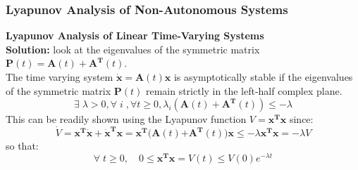 \documentclass[11pt,handout]{beamer}   %
\begin{document}
\begin{frame}
\frametitle{Lyapunov Analysis of Non-Autonomous Systems}
\small
\textbf{Lyapunov Analysis of Linear Time-Varying Systems}\\
\vspace{6pt}
\textbf{Solution:} look at the eigenvalues of the symmetric matrix $\mathbf{P}(t) = \mathbf{A}(t) + \mathbf{A^T}(t)$.\\
\vspace{6pt}
The time varying system $\mathbf{\dot{x}} = \mathbf{A}(t) \mathbf{x}$ is asymptotically stable if the eigenvalues of the symmetric matrix $\mathbf{P}(t)$ remain strictly in the left-half complex plane.\\
\begin{equation*}
\exists \; \lambda > 0 , \forall \; i \; , \forall t \geq 0 , \lambda_i (\mathbf{A}(t) + \mathbf{A^T}(t)) \leq - \lambda
\end{equation*}
This can be readily shown using the Lyapunov function $V = \mathbf{x^T x}$ since:
\begin{equation*}
\dot{V} = \mathbf{x^T \dot{x}} + \mathbf{\dot{x}^T x} = \mathbf{x^T (A}(t)\mathbf{ + A^T}(t)\mathbf{) x} \leq -\lambda \mathbf{x^Tx} = - \lambda V
\end{equation*}
so that:
\begin{equation*}
\forall \; t \geq 0 , \quad   0 \leq \mathbf{x^Tx} = V(t) \leq V(0) e^{-\lambda t}
\end{equation*}
\end{frame}
\end{document}
